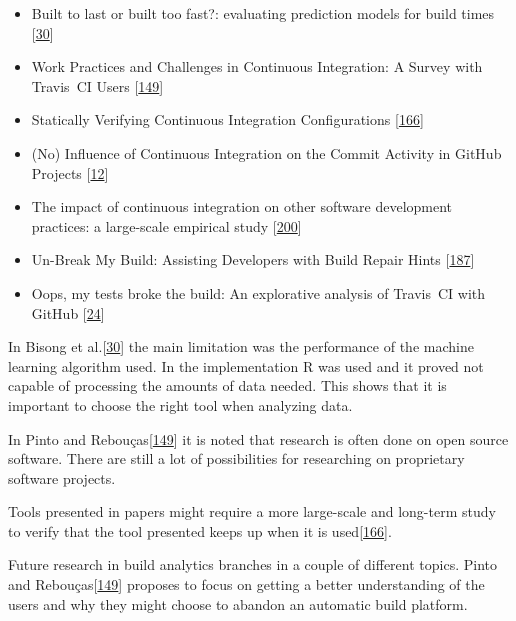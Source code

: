 \documentclass[]{book}
\providecommand{\tightlist}{%
  \setlength{\itemsep}{0pt}\setlength{\parskip}{0pt}}
\begin{document}
\begin{itemize}
\tightlist
\item
  Built to last or built too fast?: evaluating prediction models for
  build times {[}\protect\hyperlink{ref-bisong2017built}{30}{]}
\item
  Work Practices and Challenges in Continuous Integration: A Survey with
  Travis~CI Users {[}\protect\hyperlink{ref-pinto2018work}{149}{]}
\item
  Statically Verifying Continuous Integration Configurations
  {[}\protect\hyperlink{ref-santolucito2018statically}{166}{]}
\item
  (No) Influence of Continuous Integration on the Commit Activity in
  GitHub Projects {[}\protect\hyperlink{ref-baltes2018no}{12}{]}
\item
  The impact of continuous integration on other software development
  practices: a large-scale empirical study
  {[}\protect\hyperlink{ref-zhao2017impact}{200}{]}
\item
  Un-Break My Build: Assisting Developers with Build Repair Hints
  {[}\protect\hyperlink{ref-vassallo2018break}{187}{]}
\item
  Oops, my tests broke the build: An explorative analysis of Travis~CI
  with GitHub {[}\protect\hyperlink{ref-beller2017oops}{24}{]}
\end{itemize}

In Bisong et al.{[}\protect\hyperlink{ref-bisong2017built}{30}{]} the
main limitation was the performance of the machine learning algorithm
used. In the implementation R was used and it proved not capable of
processing the amounts of data needed. This shows that it is important
to choose the right tool when analyzing data.

In Pinto and Rebouças{[}\protect\hyperlink{ref-pinto2018work}{149}{]} it
is noted that research is often done on open source software. There are
still a lot of possibilities for researching on proprietary software
projects.

Tools presented in papers might require a more large-scale and long-term
study to verify that the tool presented keeps up when it is
used{[}\protect\hyperlink{ref-santolucito2018statically}{166}{]}.

Future research in build analytics branches in a couple of different
topics. Pinto and
Rebouças{[}\protect\hyperlink{ref-pinto2018work}{149}{]} proposes to
focus on getting a better understanding of the users and why they might
choose to abandon an automatic build platform.
\end{document}
